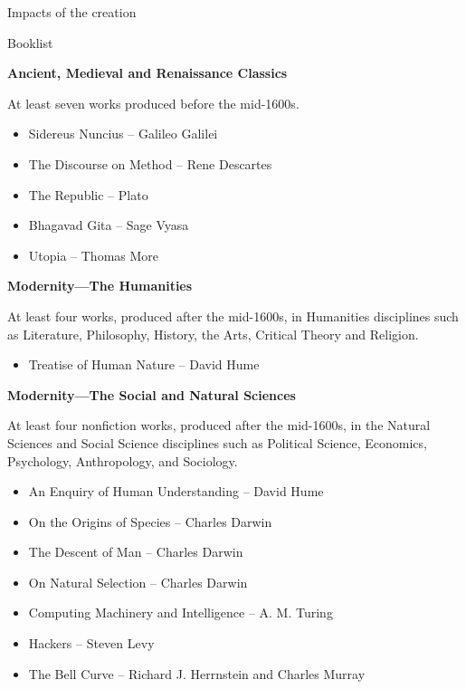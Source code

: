 \documentclass[11pt]{article}
\begin{document}
{\large Impacts of the creation\par}

\newpage

{\Large Booklist\\\par}

\par \textbf{Ancient, Medieval and Renaissance Classics}
\par At least seven works produced before the mid-1600s.
\begin{itemize}
	\item Sidereus Nuncius ­-- Galileo Galilei
	\item The Discourse on Method -- Rene Descartes
	\item The Republic -- Plato
	\item Bhagavad Gita -- Sage Vyasa
	\item Utopia -- Thomas More
\end{itemize}

\par \textbf{Modernity—The Humanities}
\par At least four works, produced after the mid-1600s, in Humanities disciplines such as Literature, Philosophy, History, the Arts, Critical Theory and Religion.
\begin{itemize}
	\item Treatise of Human Nature -- David Hume
\end{itemize}

\par \textbf{Modernity—The Social and Natural Sciences}
\par At least four nonfiction works, produced after the mid-1600s, in the Natural Sciences and Social Science disciplines such as Political Science, Economics, Psychology, Anthropology, and Sociology.
\begin{itemize}
	\item An Enquiry of Human Understanding -- David Hume
	\item On the Origins of Species -- Charles Darwin
	\item The Descent of Man -- Charles Darwin
	\item On Natural Selection -- Charles Darwin
	\item Computing Machinery and Intelligence -- A. M. Turing
	\item Hackers -- Steven Levy
	\item The Bell Curve -- Richard J. Herrnstein and Charles Murray
\end{itemize}
\end{document}
